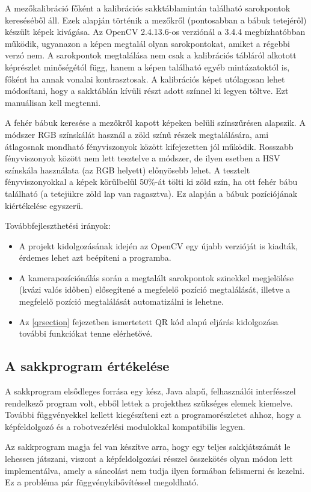 \documentclass[../documentation.tex]{subfiles}
\begin{document}
A mezőkalibráció főként a kalibrációs sakktáblamintán található sarokpontok kereséséből áll. Ezek alapján történik a mezőkről (pontosabban a bábuk tetejéről) készült képek kivágása. Az OpenCV 2.4.13.6-os verziónál a 3.4.4 megbízhatóbban működik, ugyanazon a képen megtalál olyan sarokpontokat, amiket a régebbi verzó nem. A sarokpontok megtalálása nem csak a kalibrációs tábláról alkotott képrészlet minőségétól függ, hanem a képen található egyéb mintázatoktól is, főként ha annak vonalai kontrasztosak. A kalibrációs képet utólagosan lehet módosítani, hogy a sakktáblán kívüli részt adott színnel ki legyen töltve. Ezt manuálisan kell megtenni.

A fehér bábuk keresése a mezőkről kapott képeken belüli színszűrésen alapszik. A módszer RGB színskálát használ a zöld színű részek megtalálására, ami átlagosnak mondható fényviszonyok között kifejezetten jól működik. Rosszabb fényviszonyok között nem lett tesztelve a módszer, de ilyen esetben a HSV színskála használata (az RGB helyett) előnyösebb lehet. A tesztelt fényviszonyokkal a képek körülbelül 50\%-át tölti ki zöld szín, ha ott fehér bábu található (a tetejükre zöld lap van ragasztva). Ez alapján a bábuk pozíciójának kiértékelése egyszerű.

Továbbfejleszthetési irányok:
\begin{itemize}
	\item A projekt kidolgozásának idején az OpenCV egy újabb verzióját is kiadták, érdemes lehet azt beépíteni a programba.
	\item A kamerapozíciónálás során a megtalált sarokpontok szinekkel megjelölése (kvázi valós időben) elősegítené a megfelelő pozíció megtalálását, illetve a megfelelő pozíció megtalálását automatizálni is lehetne.
	\item Az \ref{qrsection} fejezetben ismertetett QR kód alapú eljárás kidolgozása további funkciókat tenne elérhetővé.
\end{itemize}

\subsection{A sakkprogram értékelése}
A sakkprogram elsődleges forrása egy kész, Java alapű, felhasználói interfésszel rendelkező program volt, ebből lettek a projekthez szükséges elemek kiemelve. További függvényekkel kellett kiegészíteni ezt a programorészletet ahhoz, hogy a képfeldolgozó és a robotvezérlési modulokkal kompatibilis legyen.

Az sakkprogram magja fel van készítve arra, hogy egy teljes sakkjátszámát le lehessen játszani, viszont a képfeldolgozási résszel összekötés olyan módon lett implementálva, amely a sáncolást nem tudja ilyen formában felismerni és kezelni. Ez a probléma pár függvénykibővítéssel megoldható.
\end{document}
